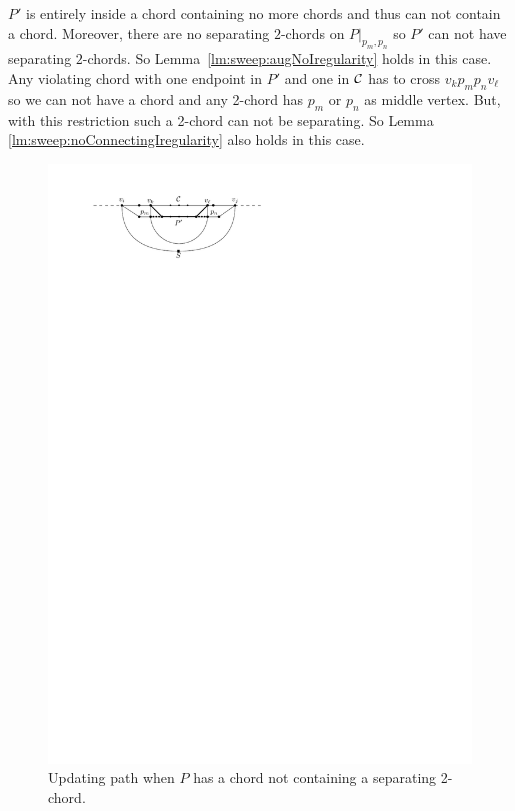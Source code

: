       $P'$ is entirely inside a chord containing no more chords and thus can not contain a chord.
      Moreover, there are no separating $2$-chords on $P|_{p_m, p_n}$ so $P'$ can not have separating $2$-chords.
      So Lemma~\ref{lm:sweep:augNoIregularity} holds in this case.
      Any violating chord with one endpoint in $P'$ and one in $\mathcal{C}$ has to cross $v_k p_m p_n v_\ell$ so we can not have a chord and any 2-chord has $p_m$ or $p_n$ as middle vertex.
      But, with this restriction such a 2-chord can not be separating.
      So Lemma \ref{lm:sweep:noConnectingIregularity} also holds in this case.

      \begin{figure}[!b]
        \centering
        \includegraphics[scale=1]{unifiedAlgo/img/sweep/cases/chordUpdate}
        \caption{Updating path when $P$ has a chord not containing a separating 2-chord.}
        \label{fig:sweep:chordUpdate}

\end{figure}
